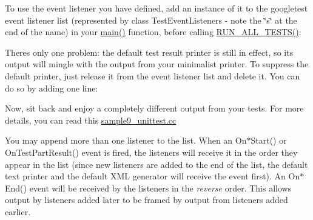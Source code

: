 To use the event listener you have defined, add an instance of it to the googletest event listener list (represented by class Test\+Event\+Listeners -\/ note the \char`\"{}s\char`\"{} at the end of the name) in your {\ttfamily \mbox{\hyperlink{3_814_83_2CompilerIdC_2CMakeCCompilerId_8c_a0ddf1224851353fc92bfbff6f499fa97}{main()}}} function, before calling {\ttfamily \mbox{\hyperlink{gtest_8h_a853a3792807489591d3d4a2f2ff9359f}{R\+U\+N\+\_\+\+A\+L\+L\+\_\+\+T\+E\+S\+T\+S()}}}\+:


\begin{DoxyCode}{0}
\DoxyCodeLine{\}}
\end{DoxyCode}


There\textquotesingle{}s only one problem\+: the default test result printer is still in effect, so its output will mingle with the output from your minimalist printer. To suppress the default printer, just release it from the event listener list and delete it. You can do so by adding one line\+:


\begin{DoxyCode}{0}
\end{DoxyCode}


Now, sit back and enjoy a completely different output from your tests. For more details, you can read this \mbox{\hyperlink{sample9__unittest_8cc}{sample9\+\_\+unittest.\+cc}}

You may append more than one listener to the list. When an {\ttfamily On$\ast$\+Start()} or {\ttfamily On\+Test\+Part\+Result()} event is fired, the listeners will receive it in the order they appear in the list (since new listeners are added to the end of the list, the default text printer and the default X\+ML generator will receive the event first). An {\ttfamily On$\ast$\+End()} event will be received by the listeners in the {\itshape reverse} order. This allows output by listeners added later to be framed by output from listeners added earlier.

